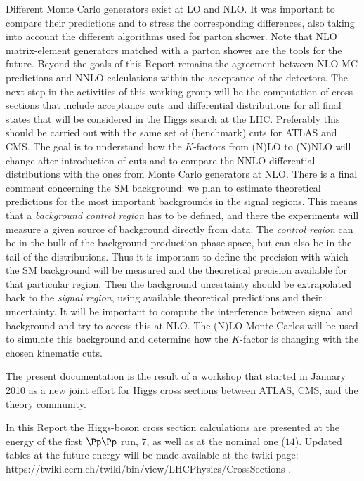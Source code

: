 Different Monte Carlo generators exist at LO and NLO. It was important 
to compare their predictions and to stress the corresponding differences, 
also taking into account the different algorithms used for 
parton shower. 
Note that NLO matrix-element generators matched with a parton shower 
are the tools for the future.
Beyond the goals of this Report remains the agreement between NLO MC 
predictions and NNLO calculations within the acceptance of the detectors.
The next step in the activities of this working group will be
the computation of cross sections that include acceptance cuts and differential
distributions for all final 
states that will be considered in the Higgs search at the LHC.
Preferably this should be carried out with the same set of (benchmark) cuts for
ATLAS and CMS. The goal is to understand how the $K$-factors from (N)LO 
to (N)NLO will change after introduction of cuts and to compare the NNLO 
differential distributions with the ones from Monte Carlo generators at 
NLO.
There is a final comment concerning the SM background: we plan to estimate
theoretical predictions for the most important backgrounds in the 
signal regions. This means that a {\em background control region} 
has to be defined, and there the experiments will measure a given 
source of background directly from data. 
The {\em control region} can be in the bulk of the background production 
phase space, but can also be in the tail of the distributions. Thus it 
is important to define the precision with which the SM background will be 
measured and the theoretical precision available for that particular 
region. Then the background uncertainty should be extrapolated back to 
the {\em signal region}, using available theoretical predictions and their 
uncertainty.
It will be important to compute  the interference between signal and 
background and try to access this at NLO.
The (N)LO Monte Carlos will be used to simulate this background and 
determine how the $K$-factor is changing with the chosen kinematic cuts.

The present documentation is the result of a workshop that started in
January 2010 as a new joint effort for Higgs cross sections between ATLAS, CMS,
and the theory community.

In this Report the Higgs-boson cross section calculations are presented 
at the energy of the first $\Pp\Pp$ run, $7$\UTeV, as well as at the nominal 
one ($14$\UTeV). Updated tables at the future energy will be made
available at the twiki page: 
https://twiki.cern.ch/twiki/bin/view/LHCPhysics/CrossSections .



